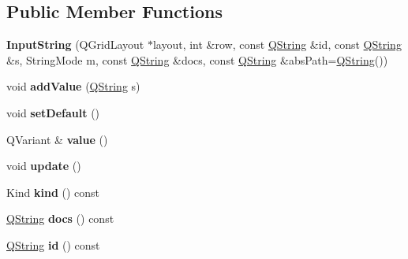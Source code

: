 \subsection*{Public Member Functions}
\begin{DoxyCompactItemize}
\item 
\mbox{\label{class_input_string_adacf356342e5fa2e55f5774364614dab}} 
{\bfseries Input\+String} (Q\+Grid\+Layout $\ast$layout, int \&row, const \mbox{\hyperlink{class_q_string}{Q\+String}} \&id, const \mbox{\hyperlink{class_q_string}{Q\+String}} \&s, String\+Mode m, const \mbox{\hyperlink{class_q_string}{Q\+String}} \&docs, const \mbox{\hyperlink{class_q_string}{Q\+String}} \&abs\+Path=\mbox{\hyperlink{class_q_string}{Q\+String}}())
\item 
\mbox{\label{class_input_string_aa8cc8ac64be65a059936950ad1e65ba8}} 
void {\bfseries add\+Value} (\mbox{\hyperlink{class_q_string}{Q\+String}} s)
\item 
\mbox{\label{class_input_string_a943d2ad1525a07c3b8852de90ac04d00}} 
void {\bfseries set\+Default} ()
\item 
\mbox{\label{class_input_string_a9c3a16a3861e950f8790d8c7e157cdc1}} 
Q\+Variant \& {\bfseries value} ()
\item 
\mbox{\label{class_input_string_a0f19d3ccb9191a54b94e1b290b525742}} 
void {\bfseries update} ()
\item 
\mbox{\label{class_input_string_a0fc1a614d9ba6384b2a2376b14e88fc5}} 
Kind {\bfseries kind} () const
\item 
\mbox{\label{class_input_string_a09913222e1500aeb77adb0cc2ce0de5a}} 
\mbox{\hyperlink{class_q_string}{Q\+String}} {\bfseries docs} () const
\item 
\mbox{\label{class_input_string_ac62ec8b4e6efe5d2fbfcc1c87be2e0da}} 
\mbox{\hyperlink{class_q_string}{Q\+String}} {\bfseries id} () const
\item 
\mbox{\label{class_input_string_ae307131faf3f1bfce80b0e97ef6d50e6}} 

\end{DoxyCompactItemize}
